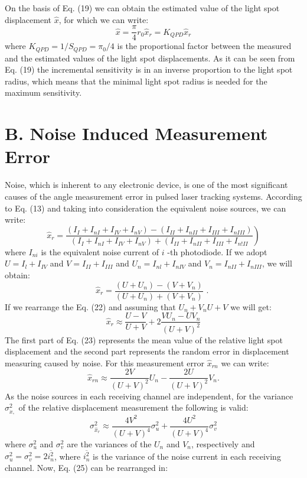 \documentclass[10pt]{article}
\begin{document}
On the basis of Eq. (19) we can obtain the estimated value of the light spot displacement \(\hat{x}\), for which we can write:
\[
\hat{x}=\frac{\pi}{4} r_{0} \hat{x}_{r}=K_{Q P D} \hat{x}_{r}
\]
where \(K_{Q P D}=1 / S_{Q P D}=\pi_{0} / 4\) is the proportional factor between the measured and the estimated values of the light spot displacements. As it can be seen from Eq. (19) the incremental sensitivity is in an inverse proportion to the light spot radius, which means that the minimal light spot radius is needed for the maximum sensitivity.

\section{B. Noise Induced Measurement Error}
Noise, which is inherent to any electronic device, is one of the most significant causes of the angle measurement error in pulsed laser tracking systems. According to Eq. (13) and taking into consideration the equivalent noise sources, we can write:
\[
\left.\hat{x}_{r}=\frac{\left(I_{I}+I_{n I}+I_{I V}+I_{n V}\right)-\left(I_{I I}+I_{n I I}+I_{I I I}+I_{n I I I}\right)}{\left(I_{I}+I_{n I}+I_{I V}+I_{n V}\right)+\left(I_{I I}+I_{n I I}+I_{I I I}+I_{n ! I I}\right.}\right)
\]
where \(I_{n i}\) is the equivalent noise current of \(i\) -th photodiode. If we adopt \(U=I_{l}+I_{I V}\) and \(V=I_{I I}+I_{I I I}\) and \(U_{n}=I_{n l}+I_{n I V}\) and \(V_{n}=I_{n I I}+I_{n I I I}\), we will obtain:
\[
\hat{x}_{r}=\frac{\left(U+U_{n}\right)-\left(V+V_{n}\right)}{\left(U+U_{n}\right)+\left(V+V_{n}\right)} \text { . }
\]
If we rearrange the Eq. (22) and assuming that \(U_{n}+V_{n} U+V\) we will get:
\[
\hat{x}_{r} \approx \frac{U-V}{U+V}+2 \frac{V U_{n}-U V_{n}}{(U+V)^{2}}
\]
The first part of Eq. (23) represents the mean value of the relative light spot displacement and the second part represents the random error in displacement measuring caused by noise. For this measurement error \(\hat{x}_{r n}\) we can write:
\[
\hat{x}_{r n} \approx \frac{2 V}{(U+V)^{2}} U_{n}-\frac{2 U}{(U+V)^{2}} V_{n} .
\]
As the noise sources in each receiving channel are independent, for the variance \(\sigma_{\dot{x},}^{2}\) of the relative displacement measurement the following is valid:
\[
\sigma_{\hat{x}_{r}}^{2} \approx \frac{4 V^{2}}{(U+V)^{4}} \sigma_{u}^{2}+\frac{4 U^{2}}{(U+V)^{4}} \sigma_{v}^{2}
\]
where \(\sigma_{u}^{2}\) and \(\sigma_{v}^{2}\) are the variances of the \(U_{n}\) and \(V_{n}\), respectively and \(\sigma_{u}^{2}=\sigma_{v}^{2}=2 \overline{i_{n}^{2}}\), where \(\overline{i_{n}^{2}}\) is the variance of the noise current in each receiving channel. Now, Eq. (25) can be rearranged in:
\end{document}
